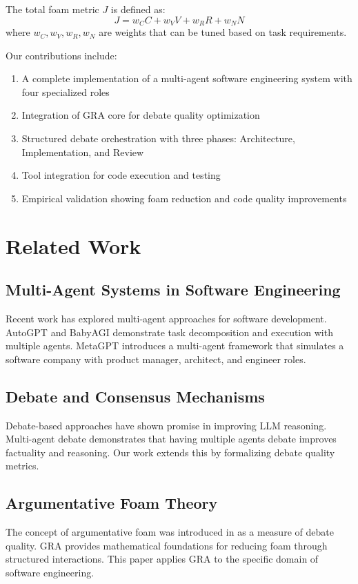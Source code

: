 \documentclass[12pt,a4paper]{article}
\begin{document}
The total foam metric $J$ is defined as:
\begin{equation}
J = w_C C + w_V V + w_R R + w_N N
\end{equation}
where $w_C, w_V, w_R, w_N$ are weights that can be tuned based on task requirements.

Our contributions include:
\begin{enumerate}
    \item A complete implementation of a multi-agent software engineering system with four specialized roles
    \item Integration of GRA core for debate quality optimization
    \item Structured debate orchestration with three phases: Architecture, Implementation, and Review
    \item Tool integration for code execution and testing
    \item Empirical validation showing foam reduction and code quality improvements
\end{enumerate}

\section{Related Work}

\subsection{Multi-Agent Systems in Software Engineering}
Recent work has explored multi-agent approaches for software development. AutoGPT \cite{autogpt} and BabyAGI \cite{babyagi} demonstrate task decomposition and execution with multiple agents. MetaGPT \cite{metagpt} introduces a multi-agent framework that simulates a software company with product manager, architect, and engineer roles.

\subsection{Debate and Consensus Mechanisms}
Debate-based approaches have shown promise in improving LLM reasoning. Multi-agent debate \cite{multiagent-debate} demonstrates that having multiple agents debate improves factuality and reasoning. Our work extends this by formalizing debate quality metrics.

\subsection{Argumentative Foam Theory}
The concept of argumentative foam was introduced in \cite{gra-forum} as a measure of debate quality. GRA provides mathematical foundations for reducing foam through structured interactions. This paper applies GRA to the specific domain of software engineering.
\end{document}
